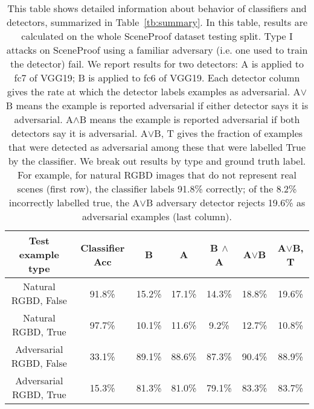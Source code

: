 \documentclass[10pt,twocolumn,letterpaper]{article}
\begin{document}
\begin{table*}[h!]
\begin{center}
\resizebox{0.72\textwidth}{!}
{
\begin{tabular}{  c | c  || c | c | c | c | c }
Test example type  & Classifier Acc & B & A & B $\wedge$ A & A$\vee$B & A$\vee$B, T\\
  \hline
Natural RGBD,  False & 91.8\% & 15.2\% & 17.1\% & 14.3\% & 18.8\% & 19.6\% \\
Natural RGBD, True & 97.7\% & 10.1\% & 11.6\% & 9.2\% & 12.7\% & 10.8\% \\
Adversarial RGBD, False & 33.1\% & 89.1\% & 88.6\% & 87.3\% & 90.4\% & 88.9\% \\
Adversarial RGBD, True & 15.3\% & 81.3\% & 81.0\% & 79.1\% & 83.3\% & 83.7\% \\
\end{tabular}
}
\vspace{0.5ex}
\caption{This table shows detailed information about behavior of classifiers and detectors, summarized in Table~\ref{tb:summary}. 
In this table, results are calculated on the whole SceneProof dataset testing split. 
Type I attacks on SceneProof using a familiar adversary (i.e. one used to train the detector) fail.  We report
  results for two detectors: A is applied to fc7 of VGG19; B is applied
  to fc6 of VGG19.  Each detector column gives the rate at which the
  detector labels examples as adversarial.  A$\vee$B  means the example is
  reported adversarial if either detector says it is adversarial.  A$\wedge$B means the example is
  reported adversarial if both detectors say it is
  adversarial. A$\vee$B, T gives the fraction of examples that
  were detected as adversarial among these that were labelled True by the classifier.  
We break out results by type and ground truth label. For example,  for natural RGBD images that do not
  represent real scenes (first row), the classifier labels 91.8\% correctly; of the 8.2\% incorrectly labelled true, the
A$\vee$B  adversary detector rejects 19.6\% as adversarial examples (last column). 
}
\label{familiaradv}
\vspace{-2ex}
\end{center}
\end{table*}
\end{document}
